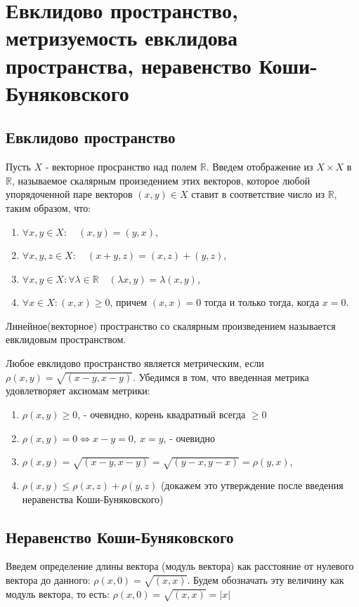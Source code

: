 \section{Евклидово пространство, метризуемость евклидова пространства, неравенство Коши-Буняковского}
\subsection{Евклидово пространство}

Пусть $X$ - векторное просранство над полем $\mathbb {R}$. Введем отображение из $X \times X$ в $\mathbb {R}$, называемое скалярным произедением этих векторов, которое любой упорядоченной паре векторов $(x, y) \in X$ ставит в соответствие число из $\mathbb {R}$, таким образом, что:


\begin{enumerate} 
  \item $\forall x,y \in X: \quad (x, y) = (y, x)$,
  \item  $\forall x,y,z \in X: \quad (x + y, z) = (x, z) + (y, z)$,
  \item $\forall x,y \in X: \forall \lambda \in \mathbb {R} \quad (\lambda x, y) = \lambda(x, y)$,
  \item $\forall x \in X: (x, x) \geq 0$, причем $(x, x) = 0$ тогда и только тогда, когда $x = 0$.
\end{enumerate}
Линейное(векторное) пространство со скалярным произведением называется евклидовым пространством.

Любое евклидово пространство является метрическим, если $\rho(x, y) = \sqrt{(x - y, x - y)}$. Убедимся в том, что введенная метрика удовлетворяет аксиомам метрики:
\begin{enumerate} 
  \item $\rho(x, y) \geq 0$, - очевидно, корень квадратный всегда $\geq 0$ 
  \item  $\rho(x, y) = 0 \Leftrightarrow x-y = 0, \: x=y$, - очевидно
  \item $\rho(x, y) = \sqrt{(x - y, x - y)} = \sqrt{(y - x, y - x)}=\rho(y, x)$,
  \item $\rho(x, y) \leq \rho(x, z) + \rho(y, z)$ (докажем это утверждение после введения неравенства Коши-Буняковского)
\end{enumerate}
\subsection{Неравенство Коши-Буняковского}
Введем определение длины вектора (модуль вектора) как расстояние от нулевого вектора до данного: $\rho(x, 0) = \sqrt{(x, x)}$. Будем обозначать эту величину как модуль вектора, то есть: $\rho(x, 0) = \sqrt{(x, x)} = |x|$

